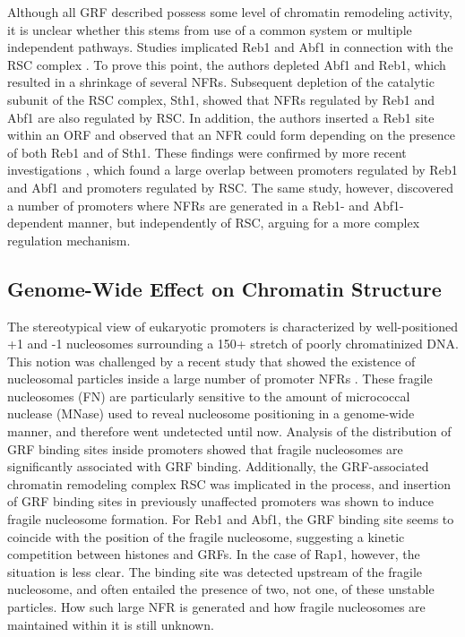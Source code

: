 Although all GRF described possess some level of chromatin remodeling activity, it is unclear whether this stems from use of a common system or multiple independent pathways. 
Studies implicated Reb1 and Abf1 in connection with the RSC complex \cite{hartley:2009:mechanisms}. 
To prove this point, the authors depleted Abf1 and Reb1, which resulted in a shrinkage of several NFRs.
Subsequent depletion of the catalytic subunit of the RSC complex, Sth1, showed that NFRs regulated by Reb1 and Abf1 are also regulated by RSC. 
In addition, the authors inserted a Reb1 site within an ORF and observed that an NFR could form depending on the presence of both Reb1 and of Sth1. 
These findings were confirmed by more recent investigations \cite{kubik:2015:nucleosome}, which found a large overlap between promoters regulated by Reb1 and Abf1 and promoters regulated by RSC. 
The same study, however, discovered a number of promoters where NFRs are generated in a Reb1- and Abf1-dependent manner, but independently of RSC, arguing for a more complex regulation mechanism. 



\subsection{Genome-Wide Effect on Chromatin Structure}

The stereotypical view of eukaryotic promoters is characterized by well-positioned +1 and -1 nucleosomes surrounding a 150+ stretch of poorly chromatinized DNA. 
This notion was challenged by a recent study that showed the existence of nucleosomal particles inside a large number of promoter NFRs \cite{kubik:2015:nucleosome}. 
These fragile nucleosomes (FN) are particularly sensitive to the amount of micrococcal nuclease (MNase) used to reveal nucleosome positioning in a genome-wide manner, and therefore went undetected until now. 
Analysis of the distribution of GRF binding sites inside promoters showed that fragile nucleosomes are significantly associated with GRF binding. 
Additionally, the GRF-associated chromatin remodeling complex RSC was implicated in the process, and insertion of GRF binding sites in previously unaffected promoters was shown to induce fragile nucleosome formation. 
For Reb1 and Abf1, the GRF binding site seems to coincide with the position of the fragile nucleosome, suggesting a kinetic competition between histones and GRFs. 
In the case of Rap1, however, the situation is less clear. The binding site was detected upstream of the fragile nucleosome, and often entailed the presence of two, not one, of these unstable particles. 
How such large NFR is generated and how fragile nucleosomes are maintained within it is still unknown. 


